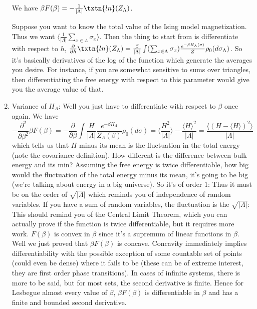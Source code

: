 \begin{enumerate}
We have $\beta F(\beta) = -\frac{1}{|\Lambda|}\txtn{ln}(Z_{\Lambda})$. 

Suppose you want to know the total value of the Ising model magnetization. Thus we want $\langle \frac{1}{|\Lambda|} \sum_{x \in \Lambda} \sigma_x \rangle$. Then the thing to start from is differentiate with respect to $h$, $\frac{\partial}{\partial h}\txtn{ln}(Z_{\Lambda}) = \frac{\beta}{|\Lambda|} \int (\sum_{x \in \Lambda} \sigma_x) \frac{e^{-\beta H_{\Lambda}(\sigma)}}{Z} \rho_0(d\sigma_{\Lambda})$. So it's basically derivatives of the log of the function which generate the averages you desire. For instance, if you are somewhat sensitive to sums over triangles, then differentiating the free energy with respect to this parameter would give you the average value of that. 

\item Variance of $H_{\Lambda}$: Well you just have to differentiate with respect to $\beta$ once again. We have 
\[
- \frac{\partial^2}{\partial\beta^2} \beta F(\beta) = - \frac{\partial}{\partial\beta} \int \frac{H}{|\Lambda|} \frac{e^{-\beta H_{\Lambda}}}{Z_{\Lambda}(\beta)} \rho_0(d\sigma) = \langle \frac{H^2}{|\Lambda|} \rangle - \frac{\langle H \rangle^2}{|\Lambda|} = \frac{\langle (H - \langle H \rangle)^2\rangle}{|\Lambda|}
\]
which tells us that $H$ minus its mean is the fluctuation in the total energy (note the covariance definition). How different is the difference between bulk energy and its min? Assuming the free energy is twice differentiable, how big would the fluctuation of the total energy minus its mean, it's going to be big (we're talking about energy in a big universe). So it's of order $1$: Thus it must be on the order of $\sqrt{|\Lambda|}$ which reminds you of independence of random variables. If you have a sum of random variables, the fluctuation is the $\sqrt{|\Lambda|}$: This should remind you of the Central Limit Theorem, which you can actually prove if the function is twice differentiable, but it requires more work. $F(\beta)$ is convex in $\beta$ since it's a supremum of linear functions in $\beta$. Well we just proved that $\beta F(\beta)$ is concave. Concavity immediately implies differentiability with the possible exception of some countable set of points (could even be dense) where it fails to be (these can be of extreme interest, they are first order phase transitions). In cases of infinite systems, there is more to be said, but for most sets, the second derivative is finite. Hence for Lesbegue almost every value of $\beta$, $\beta F(\beta)$ is differentiable in $\beta$ and has a finite and bounded second derivative. 

\end{enumerate}

